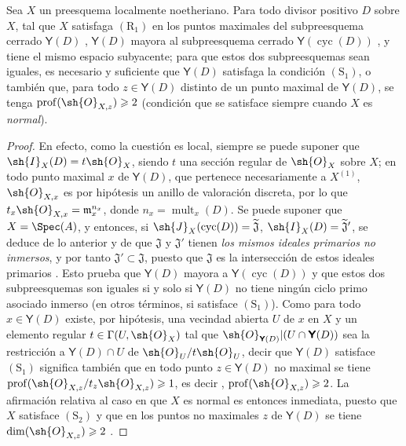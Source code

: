 \begin{corollary}[21.7.3]
\label{IV.21.7.3}
Sea $X$ un preesquema localmente noetheriano.
Para todo divisor positivo $D$ sobre $X$, tal que $X$ satisfaga $(\mathrm{R}_1)$ en los puntos maximales del subpreesquema cerrado $\boldsymbol{\mathsf{Y}}(D)$ , $\boldsymbol{\mathsf{Y}}(D)$ mayora al subpreesquema cerrado $\boldsymbol{\mathsf{Y}}(\operatorname{cyc}(D))$ , y tiene el mismo espacio subyacente;
para que estos dos subpreesquemas sean iguales, es necesario y suficiente que $\boldsymbol{\mathsf{Y}}(D)$ satisfaga la condición $(\mathrm{S}_1)$, o también que, para todo $z\in\boldsymbol{\mathsf{Y}}(D)$ distinto de un punto maximal de $\boldsymbol{\mathsf{Y}}(D)$, se tenga $\operatorname{prof}(\sh{O}_{X,z})\geq2$ \textup{(condición que se satisface siempre cuando $X$ es \emph{normal})}.
\end{corollary}

\begin{proof}
En efecto, como la cuestión es local, siempre se puede suponer que $\sh{I}_X(D)=t\sh{O}_X$, siendo $t$ una sección regular de $\sh{O}_X$ sobre $X$;
en todo punto maximal $x$ de $\boldsymbol{\mathsf{Y}}(D)$, que pertenece necesariamente a $X^{(1)}$, $\sh{O}_{X,x}$ es por hipótesis un anillo de valoración discreta, por lo que $t_x\sh{O}_{X,x}=\mathfrak{m}_x^{n_x}$, donde $n_x=\operatorname{mult}_x(D)$.
Se puede suponer que $X=\Spec(A)$, y entonces, si $\sh{J}_X(\operatorname{cyc}(D))=\widetilde{\mathfrak{J}}$, $\sh{I}_X(D)=\widetilde{\mathfrak{J}}'$, se deduce de lo anterior y de  que $\mathfrak{J}$ y $\mathfrak{J}'$ tienen \emph{los mismos ideales primarios no inmersos}, y por tanto $\mathfrak{J}'\subset\mathfrak{J}$, puesto que $\mathfrak{J}$ es la intersección
de estos ideales primarios .
Esto prueba que $\boldsymbol{\mathsf{Y}}(D)$ mayora a $\boldsymbol{\mathsf{Y}}(\operatorname{cyc}(D))$ y que estos dos subpreesquemas son iguales si y solo si $\boldsymbol{\mathsf{Y}}(D)$ no tiene ningún ciclo primo asociado inmerso (en otros términos, si satisface $(\mathrm{S}_1)$).
Como para todo $x\in\boldsymbol{\mathsf{Y}}(D)$ existe, por hipótesis, una vecindad abierta $U$ de $x$ en $X$ y un elemento regular $t\in\Gamma(U,\sh{O}_X)$ tal que $\sh{O}_{\boldsymbol{\mathsf{Y}}(D)}|(U\cap\boldsymbol{\mathsf{Y}}(D))$ sea la restricción a $\boldsymbol{\mathsf{Y}}(D)\cap U$ de $\sh{O}_U/t\sh{O}_U$, decir que $\boldsymbol{\mathsf{Y}}(D)$ satisface $(\mathrm{S}_1)$ significa también que en todo punto $z\in\boldsymbol{\mathsf{Y}}(D)$ no maximal se tiene $\operatorname{prof}(\sh{O}_{X,z}/t_z\sh{O}_{X,z})\geq1$, es decir , $\operatorname{prof}(\sh{O}_{X,z})\geq2$.
La afirmación relativa al caso en que $X$ es normal es entonces inmediata, puesto que $X$ satisface $(\mathrm{S}_2)$ y que en los puntos no maximales $z$ de $\boldsymbol{\mathsf{Y}}(D)$ se tiene $\dim(\sh{O}_{X,z})\geq2$ .
\end{proof}

